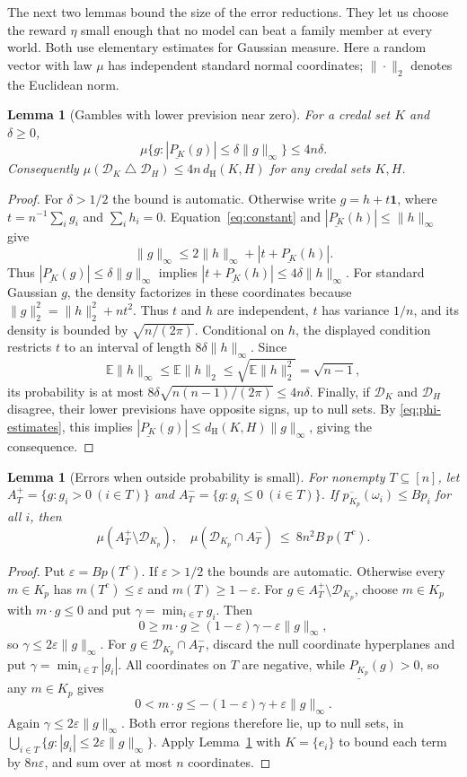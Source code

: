 \documentclass[11pt]{article}
\newtheorem{lemma}[theorem]{Lemma}
\theoremstyle{remark}
\newcommand{\one}{\mathbf 1}
\newcommand{\sd}{\mathbin{\triangle}}
\newcommand{\dH}{d_{\mathrm H}}
\newcommand{\Dscr}{\mathcal D}
\newcommand{\lpr}[1]{\underline{P_{#1}}}
\newcommand{\upprob}[1]{\overline{p_{#1}}}
\begin{document}
The next two lemmas bound the size of the error reductions. They let us
choose the reward $\eta$ small enough that no model can beat a family member
at every world. Both use elementary estimates for Gaussian measure. Here a random vector with
law $\mu$ has independent standard normal coordinates; $\|\cdot\|_2$ denotes
the Euclidean norm.

\begin{lemma}[Gambles with lower prevision near zero]\label{lem:thin}
For a credal set $K$ and $\delta\ge0$,
\[
 \mu\{g:|\lpr{K}(g)|\le\delta\|g\|_\infty\}\le4n\delta.
\]
Consequently $\mu(\Dscr_{K}\sd \Dscr_{H})\le4n\,\dH(K,H)$ for any credal sets $K,H$.
\end{lemma}
\begin{proof}
For $\delta>1/2$ the bound is automatic. Otherwise write
$g=h+t\one$, where $t=n^{-1}\sum_i g_i$ and $\sum_i h_i=0$.
Equation~\eqref{eq:constant} and $|\lpr{K}(h)|\le\|h\|_\infty$ give
\[
 \|g\|_\infty\le2\|h\|_\infty+|t+\lpr{K}(h)|.
\]
Thus $|\lpr{K}(g)|\le\delta\|g\|_\infty$ implies
$|t+\lpr{K}(h)|\le4\delta\|h\|_\infty$.
For standard Gaussian $g$, the density factorizes in these coordinates
because $\|g\|_2^2=\|h\|_2^2+nt^2$. Thus $t$ and $h$ are independent,
$t$ has variance $1/n$, and its density is bounded by
$\sqrt{n/(2\pi)}$. Conditional on $h$, the displayed condition restricts $t$
to an interval of length $8\delta\|h\|_\infty$. Since
\[
 \mathbb E\|h\|_\infty\le\mathbb E\|h\|_2
 \le\sqrt{\mathbb E\|h\|_2^2}=\sqrt{n-1},
\]
its probability is at most
$8\delta\sqrt{n(n-1)/(2\pi)}\le4n\delta$.
Finally, if $\Dscr_{K}$ and $\Dscr_{H}$ disagree, their lower previsions have opposite
signs, up to null sets. By \eqref{eq:phi-estimates}, this implies
$|\lpr{K}(g)|\le\dH(K,H)\|g\|_\infty$, giving the consequence.
\end{proof}

\begin{lemma}[Errors when outside probability is small]\label{lem:face-errors}
For nonempty $T\subseteq[n]$, let
$A_T^+=\{g:g_i>0\ (i\in T)\}$ and $A_T^-=\{g:g_i\le0\ (i\in T)\}$.
If $\upprob{K_p}(\omega_i)\le Bp_i$ for all $i$, then
\[
 \mu(A_T^+\setminus \Dscr_{K_p}),\quad\mu(\Dscr_{K_p}\cap A_T^-)
 \ \le\ 8n^2B\,p(T^c).
\]
\end{lemma}
\begin{proof}
Put $\varepsilon=Bp(T^c)$. If $\varepsilon>1/2$ the bounds are automatic.
Otherwise every $m\in K_p$ has $m(T^c)\le\varepsilon$ and
$m(T)\ge1-\varepsilon$.
For $g\in A_T^+\setminus \Dscr_{K_p}$, choose $m\in K_p$ with $m\cdot g\le0$
and put $\gamma=\min_{i\in T}g_i$. Then
\[
 0\ge m\cdot g\ge(1-\varepsilon)\gamma-\varepsilon\|g\|_\infty,
\]
so $\gamma\le2\varepsilon\|g\|_\infty$.
For $g\in \Dscr_{K_p}\cap A_T^-$, discard the null coordinate hyperplanes and
put $\gamma=\min_{i\in T}|g_i|$. All coordinates on $T$ are negative, while
$\lpr{K_p}(g)>0$, so any $m\in K_p$ gives
\[
 0<m\cdot g\le-(1-\varepsilon)\gamma+\varepsilon\|g\|_\infty.
\]
Again $\gamma\le2\varepsilon\|g\|_\infty$. Both error regions therefore lie,
up to null sets, in
$\bigcup_{i\in T}\{g:|g_i|\le2\varepsilon\|g\|_\infty\}$.
Apply Lemma~\ref{lem:thin} with $K=\{e_i\}$ to bound each term by
$8n\varepsilon$, and sum over at most $n$ coordinates.
\end{proof}
\end{document}
